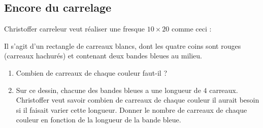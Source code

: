
\subsection*{Encore du carrelage}

Christoffer carreleur veut réaliser une fresque \( 10\times 20\) comme ceci :
\begin{center}
   
\end{center}
Il s'agit d'un rectangle de carreaux blancs, dont les quatre coins sont rouges (carreaux hachurés) et contenant deux bandes bleues au milieu.

\begin{enumerate}
    \item
        Combien de carreaux de chaque couleur faut-il ?
    \item
        Sur ce dessin, chacune des bandes bleues a une longueur de \( 4\) carreaux. Christoffer veut savoir combien de carreaux de chaque couleur il aurait besoin si il faisait varier cette longueur. Donner le nombre de carreaux de chaque couleur en fonction de la longueur de la bande bleue.
\end{enumerate}
